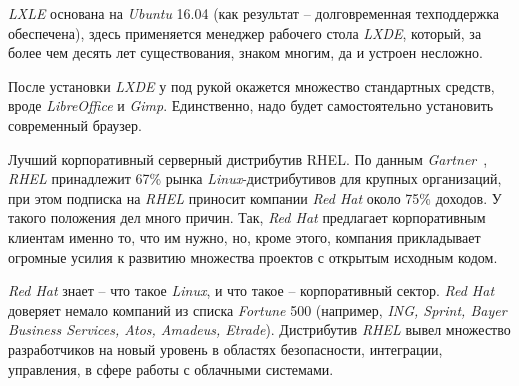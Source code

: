 \textit{LXLE} основана на \textit{Ubuntu} 16.04 (как результат – долговременная техподдержка обеспечена), здесь применяется менеджер рабочего стола \textit{LXDE}, который, за более чем десять лет существования, знаком многим, да и устроен несложно.

После установки \textit{LXDE} у под рукой окажется множество стандартных средств, вроде \textit{LibreOffice} и \textit{Gimp}. Единственно, надо будет самостоятельно установить современный браузер.

Лучший корпоративный серверный дистрибутив RHEL. По данным \textit{Gartner}~\cite{linuxOffDoc}, \textit{RHEL} принадлежит 67\% рынка \textit{Linux}-дистрибутивов для крупных организаций, при этом подписка на \textit{RHEL} приносит компании \textit{Red Hat} около 75\% доходов. У такого положения дел много причин. Так, \textit{Red Hat} предлагает корпоративным клиентам именно то, что им нужно, но, кроме этого, компания прикладывает огромные усилия к развитию множества проектов с открытым исходным кодом.

\textit{Red Hat} знает – что такое \textit{Linux}, и что такое – корпоративный сектор. \textit{Red Hat} доверяет немало компаний из списка \textit{Fortune} 500 (например, \textit{ING, Sprint, Bayer Business Services, Atos, Amadeus, Etrade}). Дистрибутив \textit{RHEL} вывел множество разработчиков на новый уровень в областях безопасности, интеграции, управления, в сфере работы с облачными системами.



